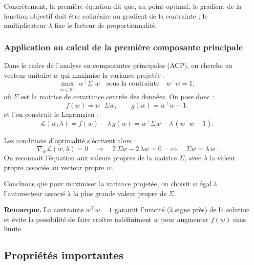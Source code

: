 \documentclass[a4paper,12pt]{report}
\begin{document}
Concrètement, la première équation dit que, au point optimal, le gradient de la fonction objectif doit être colinéaire au gradient de la contrainte ; le multiplicateur $\lambda$ fixe le facteur de proportionnalité.

\subsubsection{Application au calcul de la première composante principale}
Dans le cadre de l'analyse en composantes principales (ACP), on cherche un vecteur unitaire $w$ qui maximise la variance projetée :
\begin{equation}
    \max_{w \in \mathbb{R}^d} \; w^\top \Sigma \; w
    \quad\text{sous la contrainte}\quad
    w^\top w = 1,
\end{equation}
où $\Sigma$ est la matrice de covariance centrée des données.  
On pose donc :
\begin{equation}
    f(w) = w^\top \Sigma w, 
    \qquad g(w) = w^\top w - 1.
\end{equation}
et l'on construit le Lagrangien :
\begin{equation}
    \mathcal{L}(w,\lambda) 
    = f(w) - \lambda\,g(w)
    = w^\top \Sigma w 
      - \lambda\,(w^\top w - 1).
\end{equation}

Les conditions d'optimalité s'écrivent alors :
\begin{equation}
    \nabla_w \mathcal{L}(w,\lambda) = 0
    \quad\Longrightarrow\quad
    2\,\Sigma w - 2\,\lambda w = 0
    \quad\Longleftrightarrow\quad
    \Sigma w = \lambda\,w.
\end{equation}
On reconnait l'équation aux valeurs propres de la matrice $\Sigma$, avec $\lambda$ la valeur propre associée au vecteur propre $w$. 

Concluons que pour maximiser la variance projetée, on choisit $w$ égal à l'autovecteur associé à la plus grande valeur propre de $\Sigma$.  

\textbf{Remarque.}  
La contrainte $w^\top w = 1$ garantit l'unicité (à signe près) de la solution et évite la possibilité de faire croître indéfiniment $w$ pour augmenter $f(w)$ sans limite.

\subsection{Propriétés importantes}
\end{document}
